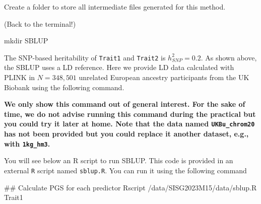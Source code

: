 \documentclass[
  letterpaper,
  DIV=11,
  numbers=noendperiod]{scrartcl}
\newenvironment{Shaded}{\begin{snugshade}}{\end{snugshade}}
\newcommand{\AttributeTok}[1]{\textcolor[rgb]{0.40,0.45,0.13}{#1}}
\newcommand{\CommentTok}[1]{\textcolor[rgb]{0.37,0.37,0.37}{#1}}
\newcommand{\DataTypeTok}[1]{\textcolor[rgb]{0.68,0.00,0.00}{#1}}
\newcommand{\ExtensionTok}[1]{\textcolor[rgb]{0.00,0.23,0.31}{#1}}
\newcommand{\FunctionTok}[1]{\textcolor[rgb]{0.28,0.35,0.67}{#1}}
\newcommand{\NormalTok}[1]{\textcolor[rgb]{0.00,0.23,0.31}{#1}}
\newcommand{\StringTok}[1]{\textcolor[rgb]{0.13,0.47,0.30}{#1}}
\newcommand{\VariableTok}[1]{\textcolor[rgb]{0.07,0.07,0.07}{#1}}
\begin{document}
Create a folder to store all intermediate files generated for this
method.

(Back to the terminal!)

\begin{Shaded}
\begin{Highlighting}[]
\FunctionTok{mkdir}\NormalTok{ SBLUP}
\end{Highlighting}
\end{Shaded}

The SNP-based heritability of \texttt{Trait1} and \texttt{Trait2} is
\(h^2_{SNP} = 0.2\). As shown above, the SBLUP uses a LD reference. Here
we provide LD data calculated with PLINK in \(N=348,501\) unrelated
European ancestry participants from the UK Biobank using the following
command.

\begin{Shaded}
\end{Shaded}

{\textbf{We only show this command out of general interest. For the sake
of time, we do not advise running this command during the practical but
you could try it later at home. Note that the data named
\texttt{UKBu\_chrom20} has not been provided but you could replace it
another dataset, e.g., with \texttt{1kg\_hm3}.}}

You will see below an R script to run SBLUP. This code is provided in an
external \texttt{R} script named \texttt{sblup.R}. You can run it using
the following command

\begin{Shaded}
\begin{Highlighting}[]
\CommentTok{\#\# Calculate PGS for each predictor}
\ExtensionTok{Rscript}\NormalTok{ /data/SISG2023M15/data/sblup.R Trait1}
\end{Highlighting}
\end{Shaded}
\end{document}

